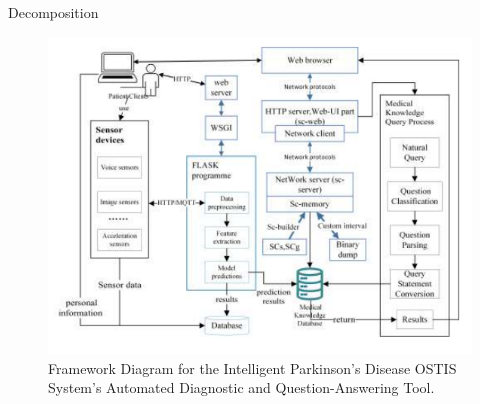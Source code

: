 \documentclass[10pt,two column]{article}
\begin{document}
\begin{SCn}
\begin{scnrelfromset}{Decomposition}
{}    
\end{scnrelfromset}
\newpage
\begin{figure}
    \includegraphics[width=\linewidth]{graphics/1.png}
    \caption{Framework Diagram for the Intelligent Parkinson’s Disease OSTIS System’s Automated Diagnostic and Question-Answering Tool.}
\end{figure}

\end{SCn}
\end{document}
